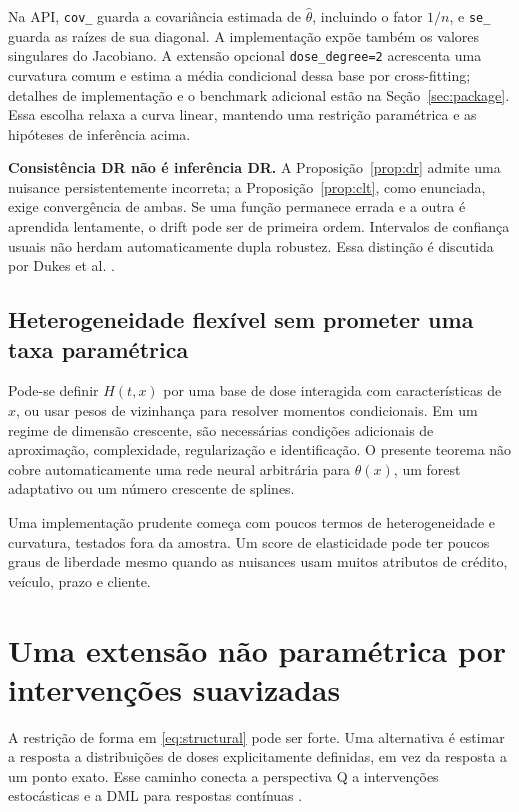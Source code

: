 \documentclass[11pt,a4paper]{article}
\begin{document}
Na API, \texttt{cov\_} guarda a covariância estimada de $\hat\theta$, incluindo o fator $1/n$, e \texttt{se\_} guarda as raízes de sua diagonal. A implementação expõe também os valores singulares do Jacobiano. A extensão opcional \texttt{dose\_degree=2} acrescenta uma curvatura comum e estima a média condicional dessa base por cross-fitting; detalhes de implementação e o benchmark adicional estão na Seção~\ref{sec:package}. Essa escolha relaxa a curva linear, mantendo uma restrição paramétrica e as hipóteses de inferência acima.

\noindent\textbf{Consistência DR não é inferência DR.} A Proposição~\ref{prop:dr} admite uma nuisance persistentemente incorreta; a Proposição~\ref{prop:clt}, como enunciada, exige convergência de ambas. Se uma função permanece errada e a outra é aprendida lentamente, o drift pode ser de primeira ordem. Intervalos de confiança usuais não herdam automaticamente dupla robustez. Essa distinção é discutida por Dukes et al. \cite{dukes2024}.

\subsection{Heterogeneidade flexível sem prometer uma taxa paramétrica}
Pode-se definir $H(t,x)$ por uma base de dose interagida com características de $x$, ou usar pesos de vizinhança para resolver momentos condicionais. Em um regime de dimensão crescente, são necessárias condições adicionais de aproximação, complexidade, regularização e identificação. O presente teorema não cobre automaticamente uma rede neural arbitrária para $\theta(x)$, um forest adaptativo ou um número crescente de splines.

Uma implementação prudente começa com poucos termos de heterogeneidade e curvatura, testados fora da amostra. Um score de elasticidade pode ter poucos graus de liberdade mesmo quando as nuisances usam muitos atributos de crédito, veículo, prazo e cliente.

\section{Uma extensão não paramétrica por intervenções suavizadas}
\label{sec:stochastic}
A restrição de forma em \eqref{eq:structural} pode ser forte. Uma alternativa é estimar a resposta a distribuições de doses explicitamente definidas, em vez da resposta a um ponto exato. Esse caminho conecta a perspectiva Q a intervenções estocásticas \cite{diaz2012} e a DML para respostas contínuas \cite{kennedy2017,colangelo2020}.
\end{document}
